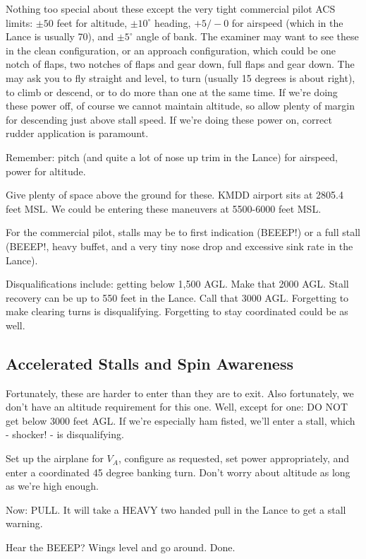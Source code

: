 Nothing too special about these except the very tight commercial pilot ACS limits: $\pm50$ feet for altitude, $\pm10^\circ$ heading, $+5/-0$ for airspeed (which in the Lance is usually 70), and $\pm5^\circ$ angle of bank. The examiner may want to see these in the clean configuration, or an approach configuration, which could be one notch of flaps, two notches of flaps and gear down, full flaps and gear down. The may ask you to fly straight and level, to turn (usually 15 degrees is about right), to climb or descend, or to do more than one at the same time. If we're doing these power off, of course we cannot maintain altitude, so allow plenty of margin for descending just above stall speed. If we're doing these power on, correct rudder application is paramount.

Remember: pitch (and quite a lot of nose up trim in the Lance) for airspeed, power for altitude.

Give plenty of space above the ground for these. KMDD airport sits at 2805.4 feet MSL. We could be entering these maneuvers at 5500-6000 feet MSL.

For the commercial pilot, stalls may be to first indication (BEEEP!) or a full stall (BEEEP!, heavy buffet, and a very tiny nose drop and excessive sink rate in the Lance).

Disqualifications include: getting below 1,500 AGL. Make that 2000 AGL. Stall recovery can be up to 550 feet in the Lance. Call that 3000 AGL. Forgetting to make clearing turns is disqualifying. Forgetting to stay coordinated could be as well.

\subsection{Accelerated Stalls and Spin Awareness}

Fortunately, these are harder to enter than they are to exit. Also fortunately, we don't have an altitude requirement for this one. Well, except for one: DO NOT get below 3000 feet AGL. If we're especially ham fisted, we'll enter a stall, which - shocker! - is disqualifying.

Set up the airplane for $V_A$, configure as requested, set power appropriately, and enter a coordinated 45 degree banking turn. Don't worry about altitude as long as we're high enough.

Now: PULL. It will take a HEAVY two handed pull in the Lance to get a stall warning.

Hear the BEEEP? Wings level and go around. Done.

